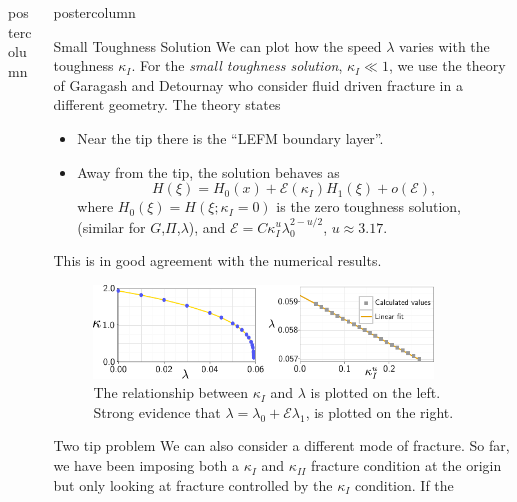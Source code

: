 \documentclass{beamer}
\newcommand{\cE}{\mathcal{E}}                               %
\newlength{\columnheight}
\begin{document}
\begin{frame}
\begin{columns}
\begin{column}{.43\textwidth}
\begin{beamercolorbox}[center]{postercolumn}
\begin{minipage}{.98\textwidth}
{}\end{minipage}\end{beamercolorbox}
\end{column}
\begin{column}{.57\textwidth}
\begin{beamercolorbox}[center]{postercolumn}
\begin{minipage}{.98\textwidth} %
\parbox[t][\columnheight]{\textwidth}{ %
\begin{myblock}{Small Toughness Solution}
We can plot how the speed $\lambda$ varies with the toughness $\kappa_I$.
For the \emph{small toughness solution}, $\kappa_I \ll 1$, we 
use the theory of Garagash and Detournay \cite{GandD} who consider
fluid driven fracture in a different geometry.
The theory states
\begin{itemize}
\item Near the tip there is the ``LEFM boundary layer''.
\item Away from the tip, the solution behaves as 
      \[H(\xi) = H_0(x) + \cE(\kappa_I)H_1(\xi)+o(\cE),\]
      where $H_0(\xi) = H(\xi ; \kappa_I=0)$ is  the zero toughness solution,
      (similar for $G$,$\Pi$,$\lambda$), and 
      $\cE = C \kappa_I^{u}\lambda_0^{2-u/2}$, $u \approx 3.17$. 
\end{itemize}
This is in good agreement with the numerical results.
\begin{figure}
\centering\includegraphics[width=0.9\textwidth]{l0-poster.pdf}
\caption{The relationship between $\kappa_I$ and $\lambda$ is plotted on the left.
         Strong evidence that $\lambda = \lambda_0 + \cE \lambda_1$, is plotted  
         on the right.}
\end{figure}
\end{myblock}\vfill
\begin{myblock}{Two tip problem}
We can also consider a different mode of fracture. So far, we have been
imposing both a $\kappa_I$ and $\kappa_{II}$ fracture condition at the origin but 
only looking at fracture controlled by the $\kappa_I$ condition. If the 

\end{myblock}}
\end{minipage}
\end{beamercolorbox}
\end{column}
\end{columns}
\end{frame}
\end{document}
